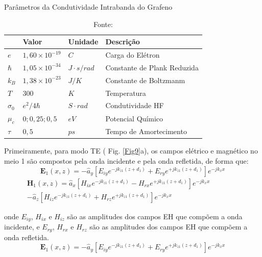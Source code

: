 \begin{table}[htb]
\ABNTEXfontereduzida
\center \caption{Parâmetros da Condutividade Intrabanda do Grafeno \cite{b5}\cite{b13}}
\label{Tab}
\begin{tabular}{p{0.6cm} p{2cm} p{2cm} p{6cm}}
  \hline
   \textbf{ } & \textbf{Valor}  & \textbf{Unidade}  & \textbf{Descrição}  \\[1.5pt]
   	\hline
$e$  &  $1,60\times10^{-19}$  &   $C$  &    Carga do Elétron\\[1.5pt]
$\hbar$   &   $1,05\times10^{-34}$ & $J\!\cdot\!s/rad $ & Constante de Plank Reduzida\\[1.5pt]
$k_B$   &   $1,38\times10^{-23}$ & $J/K $ & Constante de Boltzmanm\\[1.5pt]
$T$   &   $300$ & $K$ &  Temperatura\\
$\sigma_0$   &   $e^2/4\hbar$ & $S\!\cdot\!rad$ & Condutividade HF\\[1.5pt]
$\mu_c$   &   $0; 0,25; 0,5$ & $eV$ & Potencial Químico\\[1.5pt]
$\tau$   &   $0,5$ & $ps$ & Tempo de Amortecimento\\[1.5pt]
\hline
\end{tabular}  
  \vspace{1.5pt}
  \caption*{\footnotesize Fonte: \cite{ordonez2003projeto}}
\end{table}

Primeiramente, para modo TE ( Fig. \ref{Fig9}a), os campos elétrico e magnético no meio 1 são compostos pela onda incidente e pela onda refletida, de forma que:
\begin{equation}\label{eq3.2}
\textbf{E}_1(x,z) = -\hat{a}_y\left[E_{iy}e^{-jk_{z1}(z+d_1)} + E_{ry}e^{+jk_{z1}(z+d_1)}\right]e^{-jk_x x}  
\end{equation}
\begin{equation}\label{eq3.3}
\begin{split}
\textbf{H}_1(x,z) = \hat{a}_x\left[H_{ix}e^{-jk_{z1}(z+d_1)} - H_{rx}e^{+jk_{z1}(z+d_1)}\right]e^{-jk_x x} \qquad\qquad
\\
-\hat{a}_z\left[H_{iz}e^{-jk_{z1}(z+d_1)} + H_{rz}e^{+jk_{z1}(z+d_1)}\right]e^{-jk_x x} 
\end{split}
\end{equation}

\noindent onde $E_{iy}$, $H_{ix}$ e $H_{iz}$ são as amplitudes dos campos EH que compõem a onda incidente, e $E_{ry}$, $H_{rx}$ e $H_{rz}$ são as amplitudes dos campos EH que compõem a onda refletida.
\begin{equation}\label{eq3.2}
\textbf{E}_1(x,z) = -\hat{a}_y\left[E_{iy}e^{-jk_{z1}(z+d_1)} + E_{ry}e^{+jk_{z1}(z+d_1)}\right]e^{-jk_x x}  
\end{equation}
